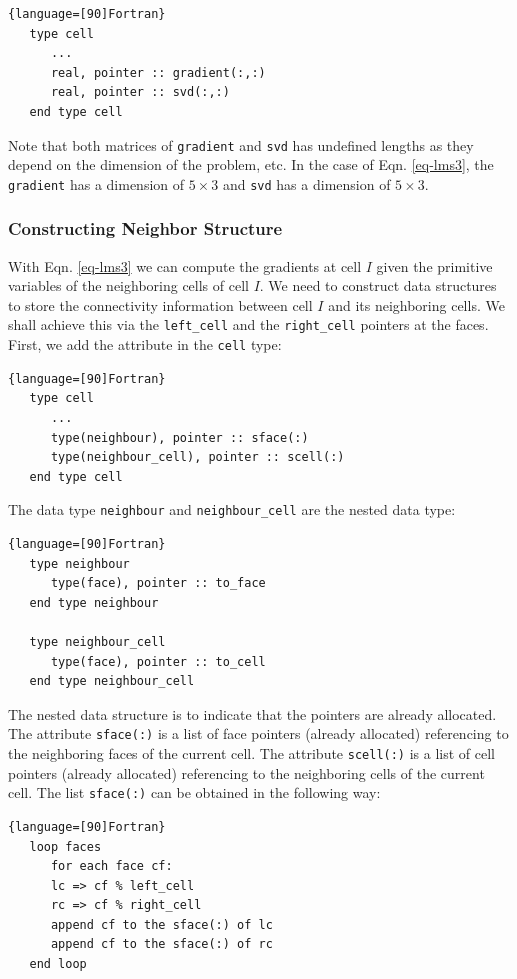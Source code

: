 \documentclass[12pt, letterpaper]{report}
\begin{document}
\begin{lstlisting}{language=[90]Fortran}
   type cell
      ...
      real, pointer :: gradient(:,:)
      real, pointer :: svd(:,:)
   end type cell
\end{lstlisting}

Note that both matrices of \verb+gradient+ and \verb+svd+ has undefined lengths as they depend on
the dimension of the problem, etc. In the case of Eqn. \ref{eq-lms3}, the \verb+gradient+ has a
dimension of $5\times3$ and \verb+svd+ has a dimension of $5\times3$.


\subsubsection{Constructing Neighbor Structure}

With Eqn. \ref{eq-lms3} we can compute the gradients at cell $I$ given the primitive variables of
the neighboring cells of cell $I$. We need to construct data structures to store the connectivity
information between cell $I$ and its neighboring cells. We shall achieve this via the
\verb+left_cell+ and the \verb+right_cell+ pointers at the faces. First, we add the attribute in the
\verb+cell+ type:

\begin{lstlisting}{language=[90]Fortran}
   type cell
      ...
      type(neighbour), pointer :: sface(:)
      type(neighbour_cell), pointer :: scell(:)
   end type cell
\end{lstlisting}

The data type \verb+neighbour+ and \verb+neighbour_cell+ are the nested data type:

\begin{lstlisting}{language=[90]Fortran}
   type neighbour
      type(face), pointer :: to_face
   end type neighbour

   type neighbour_cell
      type(face), pointer :: to_cell
   end type neighbour_cell
\end{lstlisting}

The nested data structure is to indicate that the pointers are already allocated. The attribute
\verb+sface(:)+ is a list of face pointers (already allocated) referencing to the neighboring faces
of the current cell. The attribute \verb+scell(:)+ is a list of cell pointers (already allocated)
referencing to the neighboring cells of the current cell. The list \verb+sface(:)+ can be obtained in
the following way:

\begin{lstlisting}{language=[90]Fortran}
   loop faces
      for each face cf:
      lc => cf % left_cell
      rc => cf % right_cell
      append cf to the sface(:) of lc
      append cf to the sface(:) of rc
   end loop
\end{lstlisting}
\end{document}
